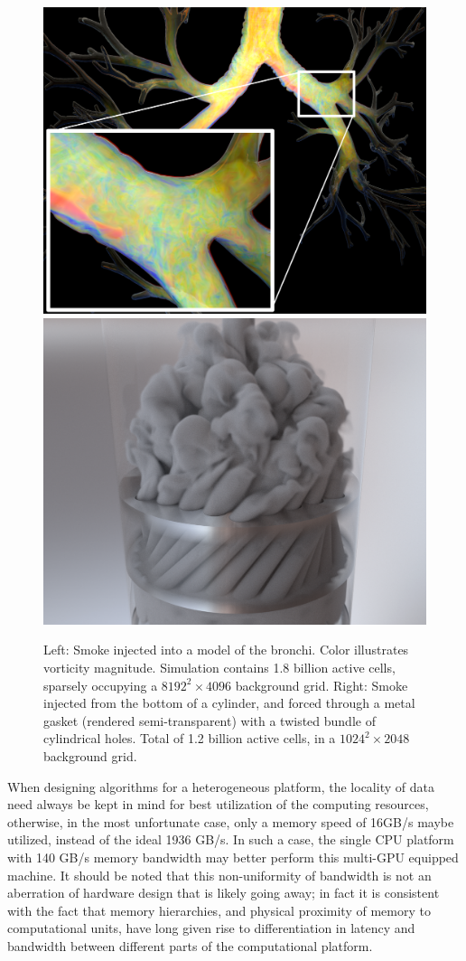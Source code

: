\begin{figure}[t!]
\includegraphics[height=.4\textwidth]{images/DD/Teaser_Part1.png}
\includegraphics[height=.4\textwidth]{images/DD/Teaser_Part2_5x4.png}
\caption{Left: Smoke injected into a model of the bronchi. Color illustrates vorticity magnitude. Simulation contains 1.8 billion active cells, sparsely
  occupying a $8192^2\!\times\!4096$ background grid. Right: Smoke injected from the bottom of a cylinder, and forced through a metal gasket (rendered semi-transparent) with a
  twisted bundle of cylindrical holes. Total of 1.2 billion active cells, in a $1024^2\!\times\!2048$ background grid.}
\label{fig:DD-teaser}
\end{figure}

When designing algorithms for a heterogeneous platform, the locality of data need always be kept in mind for best utilization of the computing resources, otherwise, in the most unfortunate case, only a memory speed of 16GB/s maybe utilized, instead of the ideal 1936 GB/s. In such a case, the single CPU platform with 140 GB/s memory bandwidth may better perform this multi-GPU equipped machine. It should be noted that this non-uniformity of bandwidth is not an aberration of hardware design that is likely going away; in fact it is consistent with the fact that memory
hierarchies, and physical proximity of memory to computational units, have long given rise to differentiation in latency and bandwidth between different parts of the computational
platform.


